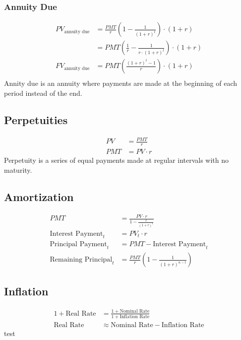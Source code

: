 \subsubsection{Annuity Due}
\begin{align*}
	PV_{\text{annuity due}} &= \frac{PMT}{r} \left(1 - \frac{1}{(1 + r)^t}\right) \cdot (1 + r) \\
	&= PMT \left(\frac{1}{r} - \frac{1}{r\cdot (1 + r)^t}\right) \cdot (1 + r) \\
	FV_{\text{annuity due}} &= PMT \left(\frac{(1 + r)^t - 1}{r}\right) \cdot (1 + r) \\
\end{align*}
Annity due is an annuity where payments are made at the beginning of each period instead of the end.
\subsection{Perpetuities}
\begin{align*}
	PV &= \frac{PMT}{r} \\
	PMT &= PV\cdot r
\end{align*}
Perpetuity is a series of equal payments made at regular intervals with no maturity.
\subsection{Amortization}
\begin{align*}
	PMT &= \frac{PV\cdot r}{1 - \frac{1}{(1 + r)^t}} \\
	\text{Interest Payment}_t &= PV_t\cdot r \\
	\text{Principal Payment}_t &= PMT - \text{Interest Payment}_t\\
	\text{Remaining Principal}_t &= \frac{PMT}{r} \left(1 - \frac{1}{(1 + r)^{n-t}}\right)
\end{align*}
\subsection{Inflation}
\begin{align*}
	1 + \text{Real Rate} &= \frac{1 + \text{Nominal Rate}}{1 + \text{Inflation Rate}} \\
	\text{Real Rate} &\approx \text{Nominal Rate} - \text{Inflation Rate}
\end{align*}
test
